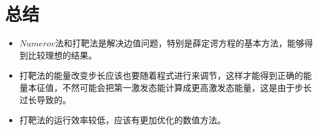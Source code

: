 \documentclass[UTF8]{ctexart}
\begin{document}
	\section{总结}

	\begin{itemize}
		\item $Numerov$法和打靶法是解决边值问题，特别是薛定谔方程的基本方法，能够得到比较理想的结果。
		
		\item 打靶法的能量改变步长应该也要随着程式进行来调节，这样才能得到正确的能量本征值，不然可能会把第一激发态能计算成更高激发态能量，这是由于步长过长导致的。
		
		\item 打靶法的运行效率较低，应该有更加优化的数值方法。
	\end{itemize}
\end{document}
